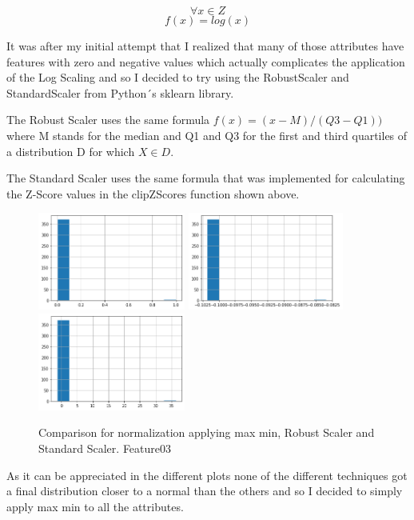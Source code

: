 \documentclass[12pt, a4paper]{article}
\begin{document}
	\[ \forall x \in Z \]
	\[ f(x) = log(x) \]
	
	It was after my initial attempt that I realized that many of those attributes have features with zero and negative values which actually complicates the application of the Log Scaling and so I decided to try using the RobustScaler and StandardScaler from Python´s sklearn library.
	
	The Robust Scaler uses the same formula $f(x) = (x - M)/(Q3-Q1)) $ where M stands for the median and Q1 and Q3 for the first and third quartiles of a distribution D for which $X \in D$.\cite{normalizeSkLearn}
	
	The Standard Scaler uses the same formula that was implemented for calculating the Z-Score values in the clipZScores function shown above.
	
	\begin{figure}[H]
		\label{Feature03Comparidson}
		\includegraphics[height=32mm]{img/plots/feature03N.png}
		\includegraphics[height=32mm]{img/plots/feature03NStandard.png}
		\includegraphics[height=32mm]{img/plots/feature03NRobust.png}
		\caption[width=50mm]{Comparison for normalization applying max min, Robust Scaler and Standard Scaler. Feature03}
	\end{figure}

	As it can be appreciated in the different plots none of the different techniques got a final distribution closer to a normal than the others and so I decided to simply apply max min to all the attributes.
	
\end{document}
